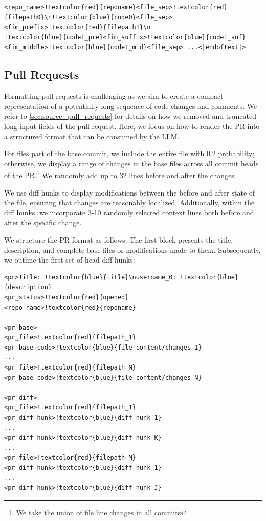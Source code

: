 \documentclass[10pt]{article} %
\begin{document}
\begin{Verbatim}[commandchars=!\{\}]
<repo_name>!textcolor{red}{reponame}<file_sep>!textcolor{red}{filepath0}\n!textcolor{blue}{code0}<file_sep><fim_prefix>!textcolor{red}{filepath1}\n
!textcolor{blue}{code1_pre}<fim_suffix>!textcolor{blue}{code1_suf}<fim_middle>!textcolor{blue}{code1_mid}<file_sep> ...<|endoftext|> 
\end{Verbatim}



\subsection{Pull Requests} \label{pr_rendering}
Formatting pull requests is challenging as we aim to create a compact representation of a potentially long sequence of code changes and comments. We refer to  \cref{sec:source_pull_requests} for details on how we removed and truncated long input fields of the pull request. Here, we focus on how to render the PR into a structured format that can be consumed by the LLM. 

For files part of the base commit, we include the entire file with 0.2 probability; otherwise, we display a range of changes in the base files across all commit heads of the PR.\footnote{We take the union of file line changes in all commits} We randomly add up to 32 lines before and after the changes. 

We use diff hunks to display modifications between the before and after state of the file, ensuring that changes are reasonably localized. Additionally, within the diff hunks, we incorporate 3-10 randomly selected context lines both before and after the specific change.

We structure the PR format as follows. The first block presents the title, description, and complete base files or modifications made to them. Subsequently, we outline the first set of head diff hunks:
\begin{Verbatim}[commandchars=!\{\}]
<pr>Title: !textcolor{blue}{title}\nusername_0: !textcolor{blue}{description}
<pr_status>!textcolor{red}{opened}
<repo_name>!textcolor{red}{reponame}
 
<pr_base>
<pr_file>!textcolor{red}{filepath_1}
<pr_base_code>!textcolor{blue}{file_content/changes_1}
...
<pr_file>!textcolor{red}{filepath_N}
<pr_base_code>!textcolor{blue}{file_content/changes_N}
 
<pr_diff>
<pr_file>!textcolor{red}{filepath_1}
<pr_diff_hunk>!textcolor{blue}{diff_hunk_1}
...
<pr_diff_hunk>!textcolor{blue}{diff_hunk_K}
...
<pr_file>!textcolor{red}{filepath_M}
<pr_diff_hunk>!textcolor{blue}{diff_hunk_1}
...
<pr_diff_hunk>!textcolor{blue}{diff_hunk_J}
\end{Verbatim}
\end{document}
